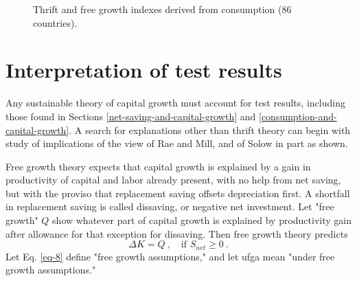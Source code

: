 \documentclass[a4paper,fleqn]{latex_styles/cas-sc}
\begin{document}
\begin{figure}[pos=H]
    \centering
    \quad %
    \captionsetup{justification=centering}
    \caption{Thrift and free growth indexes derived from consumption (86 countries).}
    \label{fig-c_plots}
\end{figure}



\section{Interpretation of test results\label{interpretation-of-test-results}}

Any sustainable theory of capital growth must account for test results, including those found in Sections \ref{net-saving-and-capital-growth} and \ref{consumption-and-capital-growth}. A search for explanations other than thrift theory can begin with study of implications of the view of Rae and Mill, and of Solow in part as shown.

Free growth theory expects that capital growth is explained by a gain in productivity of capital and labor already present, with no help from net saving, but with the proviso that replacement saving offsets depreciation first. A shortfall in replacement saving is called dissaving, or negative net investment. Let "free growth" \(Q\) show whatever part of capital growth is explained by productivity gain after allowance for that exception for dissaving. Then free growth theory predicts
%
\begin{equation}
\Delta K = Q \ , \quad \text{if } S_{net} \geq 0 \ . \label{eq-9}
\end{equation}
%
Let Eq. \eqref{eq-8} define "free growth assumptions," and let ufga mean "under free growth assumptions."
\end{document}
